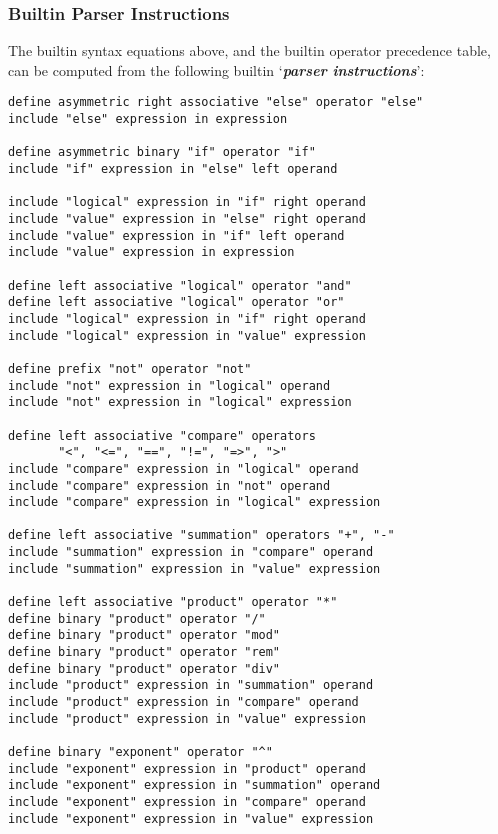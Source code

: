 \documentclass[12pt]{article}
\newcommand{\skey}[2]{{\bf \em #1#2}\index{#1}}
\newenvironment{indpar}[1][0.3in]%
	{\begin{list}{}%
		     {\setlength{\itemsep}{0in}%
		      \setlength{\topsep}{0in}%
		      \setlength{\parsep}{1ex}%
		      \setlength{\labelwidth}{#1}%
		      \setlength{\leftmargin}{#1}%
		      \addtolength{\leftmargin}{\labelsep}}%
	 \item}%
	{\end{list}}
\begin{document}
\subsubsection{Builtin Parser Instructions}
\label{BUILTIN-PARSER-INSTRUCTIONS}

The builtin syntax equations above, and the builtin operator
precedence table, can be computed from the following builtin
`\skey{parser instruction}s':

\begin{indpar}\begin{verbatim}
define asymmetric right associative "else" operator "else"
include "else" expression in expression

define asymmetric binary "if" operator "if"
include "if" expression in "else" left operand

include "logical" expression in "if" right operand
include "value" expression in "else" right operand
include "value" expression in "if" left operand
include "value" expression in expression

define left associative "logical" operator "and"
define left associative "logical" operator "or"
include "logical" expression in "if" right operand
include "logical" expression in "value" expression

define prefix "not" operator "not"
include "not" expression in "logical" operand
include "not" expression in "logical" expression

define left associative "compare" operators
       "<", "<=", "==", "!=", "=>", ">"
include "compare" expression in "logical" operand
include "compare" expression in "not" operand
include "compare" expression in "logical" expression

define left associative "summation" operators "+", "-"
include "summation" expression in "compare" operand
include "summation" expression in "value" expression

define left associative "product" operator "*"
define binary "product" operator "/"
define binary "product" operator "mod"
define binary "product" operator "rem"
define binary "product" operator "div"
include "product" expression in "summation" operand
include "product" expression in "compare" operand
include "product" expression in "value" expression

define binary "exponent" operator "^"
include "exponent" expression in "product" operand
include "exponent" expression in "summation" operand
include "exponent" expression in "compare" operand
include "exponent" expression in "value" expression


\end{verbatim}
\end{indpar}
\end{document}
